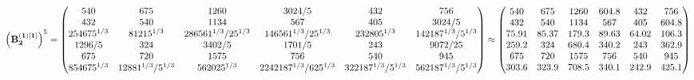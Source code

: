 \documentclass[10pt,a4paper]{article}
\begin{document}
	\[
		\left(\bold{B_2^{(1)[1]}}\right)^{5} = 
		\begin{pmatrix}
			{{540}}{} & {{675}}{} & {{1260}}{} & {{3024}} / {{5}} & {{432}}{} & {{756}}{} \\
			{{432}}{} & {{540}}{} & {{1134}}{} & {{567}}{} & {{405}}{} & {{3024}} / {{5}} \\
			{{2}{54675^ {1 / 3}}}{} & {{8}{1215^ {1 / 3}}}{} & {{28}{6561^ {1 / 3}}} / {{25^ {1 / 3}}} & {{14}{6561^ {1 / 3}}} / {{25^ {1 / 3}}} & {{2}{32805^ {1 / 3}}}{} & {{14}{2187^ {1 / 3}}} / {{5^ {1 / 3}}} \\
			{{1296}} / {{5}} & {{324}}{} & {{3402}} / {{5}} & {{1701}} / {{5}} & {{243}}{} & {{9072}} / {{25}} \\
			{{675}}{} & {{720}}{} & {{1575}}{} & {{756}}{} & {{540}}{} & {{945}}{} \\
			{{8}{54675^ {1 / 3}}}{} & {{128}{81^ {1 / 3}}} / {{5^ {1 / 3}}} & {{56}{2025^ {1 / 3}}}{} & {{224}{2187^ {1 / 3}}} / {{625^ {1 / 3}}} & {{32}{2187^ {1 / 3}}} / {{5^ {1 / 3}}} & {{56}{2187^ {1 / 3}}} / {{5^ {1 / 3}}} \\
		\end{pmatrix}
		\approx
		\begin{pmatrix}
			540      & 675      & 1260     & 604.8    & 432      & 756      \\
			432      & 540      & 1134     & 567      & 405      & 604.8    \\
			75.91    & 85.37    & 179.3    & 89.63    & 64.02    & 106.3    \\
			259.2    & 324      & 680.4    & 340.2    & 243      & 362.9    \\
			675      & 720      & 1575     & 756      & 540      & 945      \\
			303.6    & 323.9    & 708.5    & 340.1    & 242.9    & 425.1    \\
		\end{pmatrix}
	\]
\end{document}
